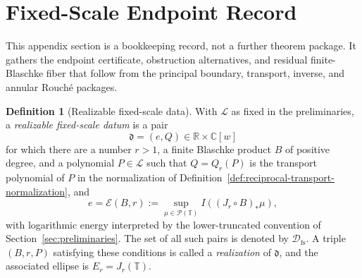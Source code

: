 \documentclass[12pt,a4paper]{article}
\theoremstyle{plain}
\theoremstyle{definition}
\newtheorem{definition}[theorem]{Definition}
\numberwithin{equation}{section}
\newcommand{\RR}{\mathbb{R}}
\newcommand{\CC}{\mathbb{C}}
\newcommand{\TT}{\mathbb{T}}
\begin{document}


\section{Fixed-Scale Endpoint Record}\label{app:fixed-scale-record}

This appendix section is a bookkeeping record, not a further theorem
package.  It gathers the endpoint certificate, obstruction alternatives,
and residual finite-Blaschke fiber that follow from the principal
boundary, transport, inverse, and annular Rouch\'e packages.

\begin{definition}[Realizable fixed-scale data]\label{def:realizable-boundary-scale-data}
With \(\mathcal L\) as fixed in the preliminaries, a \emph{realizable fixed-scale datum} is a pair
\[
\mathfrak d=(e,Q)\in\RR\times\CC[w]
\]
for which there are a number \(r>1\), a finite Blaschke product \(B\) of positive degree, and a polynomial \(P\in\mathcal L\) such that \(Q=Q_r(P)\) is the transport polynomial of \(P\) in the normalization of Definition~\ref{def:reciprocal-transport-normalization}, and
\[
e=\mathcal E(B,r):=\sup_{\mu\in\mathcal P(\TT)} I((J_r\circ B)_\ast\mu),
\]
with logarithmic energy interpreted by the lower-truncated convention of Section~\ref{sec:preliminaries}.  The set of all such pairs is denoted by \(\mathcal D_{\mathrm{fs}}\).  A triple \((B,r,P)\) satisfying these conditions is called a \emph{realization} of \(\mathfrak d\), and the associated ellipse is \(E_r=J_r(\TT)\).
\end{definition}
\end{document}
